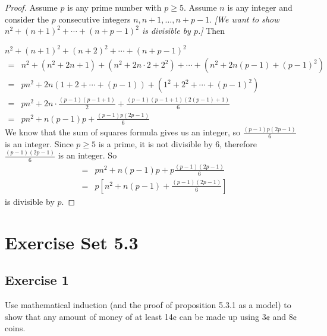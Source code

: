 \documentclass[14pt]{extarticle}
\newcommand{\dps}{\displaystyle}
\begin{document}
\begin{proof}
    Assume $p$ is any prime number with $p \geq 5$. Assume $n$ is any integer and consider the $p$ consecutive integers $n, n+1, \ldots, n+p-1$. {\it [We want to show $n^2 + (n+1)^2 + \cdots + (n+p-1)^2$ is divisible by $p$.]} Then

    $n^2 + (n+1)^2 + (n+2)^2 + \cdots + (n+p-1)^2$
    \[
        \begin{array}{lll}
            = & n^2 + (n^2 + 2n + 1) + (n^2 + 2n \cdot 2 + 2^2) + \cdots + (n^2 + 2n(p-1) + (p-1)^2) \\
            = & pn^2 + 2n(1 + 2 + \cdots + (p-1)) + (1^2 + 2^2 + \cdots + (p-1)^2)                   \\
            = & \dps pn^2 + 2n \cdot \frac{(p-1)(p-1+1)}{2} + \frac{(p-1)(p-1+1)(2(p-1)+1)}{6}       \\
            = & \dps pn^2 + n(p-1)p + \frac{(p-1)p(2p-1)}{6}
        \end{array}
    \]
    We know that the sum of squares formula gives us an integer, so $\dps \frac{(p-1)p(2p-1)}{6}$ is an integer. Since $p \geq 5$ is a prime, it is not divisible by 6, therefore $\dps\frac{(p-1)(2p-1)}{6}$ is an integer. So
    \[
        \begin{array}{lll}
            = & \dps pn^2 + n(p-1)p + p\frac{(p-1)(2p-1)}{6}            \\
            = & \dps p\left[n^2 + n(p-1) + \frac{(p-1)(2p-1)}{6}\right]
        \end{array}
    \]
    is divisible by $p$.
\end{proof}

\section{Exercise Set 5.3}

\subsection{Exercise 1}
Use mathematical induction (and the proof of proposition 5.3.1 as a model) to show that any amount of money of at least 14¢ can be made up using 3¢ and 8¢ coins.
\end{document}
